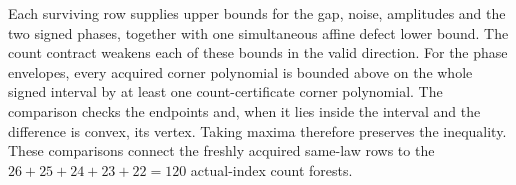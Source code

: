 Each surviving row supplies upper bounds for the gap, noise,
amplitudes and the two signed phases, together with one simultaneous
affine defect lower bound. The count contract weakens each of these
bounds in the valid direction. For the phase envelopes, every acquired
corner polynomial is bounded above on the whole signed interval by
at least one count-certificate corner polynomial. The comparison checks
the endpoints and, when it lies inside the interval and the difference
is convex, its vertex. Taking maxima therefore preserves the
inequality. These comparisons connect the freshly acquired same-law
rows to the $26+25+24+23+22=120$ actual-index count forests.
